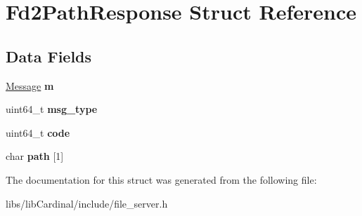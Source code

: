 \hypertarget{structFd2PathResponse}{}\section{Fd2\+Path\+Response Struct Reference}
\label{structFd2PathResponse}
\subsection*{Data Fields}
\begin{DoxyCompactItemize}
\item 
\hyperlink{structMessage}{Message} {\bfseries m}\hypertarget{structFd2PathResponse_a6689a4c31480e3ea7c445c79ccd67f68}{}\label{structFd2PathResponse_a6689a4c31480e3ea7c445c79ccd67f68}

\item 
uint64\+\_\+t {\bfseries msg\+\_\+type}\hypertarget{structFd2PathResponse_ad4c2f56ac3d88c63c3733dd10f63d79d}{}\label{structFd2PathResponse_ad4c2f56ac3d88c63c3733dd10f63d79d}

\item 
uint64\+\_\+t {\bfseries code}\hypertarget{structFd2PathResponse_a7c89feec6397ef2e80ab8401c13cea39}{}\label{structFd2PathResponse_a7c89feec6397ef2e80ab8401c13cea39}

\item 
char {\bfseries path} \mbox{[}1\mbox{]}\hypertarget{structFd2PathResponse_af4a1e36cc512ebaf63ece02414b5e7a5}{}\label{structFd2PathResponse_af4a1e36cc512ebaf63ece02414b5e7a5}

\end{DoxyCompactItemize}


The documentation for this struct was generated from the following file\+:\begin{DoxyCompactItemize}
\item 
libs/lib\+Cardinal/include/file\+\_\+server.\+h\end{DoxyCompactItemize}
